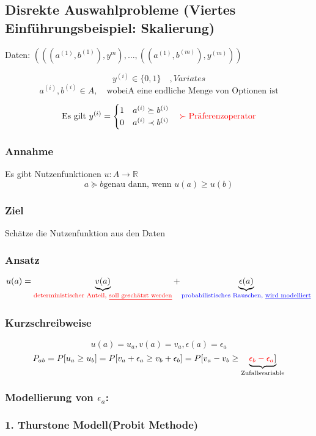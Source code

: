 	\subsection*{Disrekte Auswahlprobleme (Viertes Einführungsbeispiel: Skalierung)}
		Daten: $ (((a^{(1)}, b^{(1)}), y^{m}),\dots, ((a^{(1)}, b^{(m)}),y^{(m)})) $
		
		\[ y^{(i)} \in \{0,1\} \quad, Variates\]
		\[ a^{(i)}, b^{(i)} \in A,\quad \text{wobei} \text{A eine endliche Menge von Optionen ist}\]
		
		\[ \text{Es gilt } y^{(i)} =
		\begin{cases}1 & a^{(i)} \succeq b^{(i)}\\0 & a^{(i)} \prec b^{(i)}
		\end{cases} \quad \textcolor{red}{\succ \text{Präferenzoperator}}\]
		

		
	\subsubsection*{Annahme}
		Es gibt Nutzenfunktionen $ u : A \rightarrow \mathbb{R} $
		\[ a \succeq b \text{genau dann, wenn } u(a) \geq u(b) \]
	\subsubsection*{Ziel}
		Schätze die Nutzenfunktion aus den Daten
	\subsubsection*{Ansatz}
		\[ u(a) = \underbrace{v(a)}_{\textcolor{red}{\text{deterministischer Anteil, \underline{soll geschätzt werden}}}} + \underbrace{\epsilon(a)}_{\textcolor{blue}{\text{probabilistisches Rauschen, \underline{wird modelliert}}}}\]
		
	\subsubsection*{Kurzschreibweise}
		\[ u(a) = u_a, v(a) = v_a, \epsilon(a)= \epsilon_a\]
		\[ P_{ab} = P[u_a \geq u_b] = P[v_a + \epsilon_a \geq v_b + \epsilon_b] =P[v_a - v_b \geq \underbrace{\textcolor{red}{\epsilon_b -\epsilon_a}]}_{\text{Zufallsvariable}}\]
				
	\subsubsection*{Modellierung von $ \epsilon_a $:}
	\subsubsection*{1. Thurstone Modell(Probit Methode)}
	
